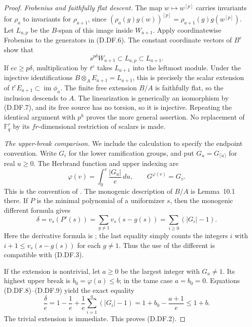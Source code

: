 \begin{proof}
\emph{Frobenius and faithfully flat descent.}
The map $w\mapsto w^{[p]}$ carries invariants for $\rho_a$ to
invariants for $\rho_{a+1}$, since
$(\rho_a(g)g(w))^{[p]}=\rho_{a+1}(g)g(w^{[p]})$.
Let $L_{a,p}$ be the $B$-span of this image inside $W_{a+1}$.
Apply coordinatewise Frobenius to the generators in (D.DF.6).
The constant coordinate vectors of $B^r$ show that
\[
 s^{p\delta}W_{a+1}\subset L_{a,p}\subset L_{a+1}.
                                                               \tag{D.DF.7}
\]
If $ec\ge p\delta$, multiplication by $t^c$ takes $L_{a+1}$
into the leftmost module. Under the injective identifications
$B\otimes_AE_{a+1}=L_{a+1}$, this is precisely the scalar
extension of $t^cE_{a+1}\subset\operatorname{im}\phi_a$.
The finite free extension $B/A$ is faithfully flat, so the
inclusion descends to $A$.
The linearization is generically an isomorphism by (D.DF.7),
and its free source has no torsion, so it is injective.
Repeating the identical argument with $p^h$ proves the more
general assertion. No replacement of $\mathbb F_q^r$ by its
$fr$-dimensional restriction of scalars is made.

\emph{The upper-break comparison.}
We include the calculation to specify the endpoint convention.
Write $G_i$ for the lower ramification groups, and put
$G_u=G_{\lceil u\rceil}$ for real $u\ge0$. The Herbrand
function and upper indexing are
\[
 \varphi(v)=\int_0^v\frac{|G_u|}{e}\,du,
                 \qquad G^{\varphi(v)}=G_v.
                                                               \tag{D.DF.8}
\]
This is the convention of
\citet[Section~10, printed pp.~28--29]{Kedlaya2010DifferentLatticeB}.
The monogenic description of $B/A$ is Lemma~10.1 there.
If $P$ is the minimal polynomial of a uniformizer $s$, then
the monogenic different formula gives
\[
 \delta=v_s(P'(s))
     =\sum_{g\ne1}v_s(s-g(s))
     =\sum_{i\ge0}(|G_i|-1).                           \tag{D.DF.9}
\]
Here the derivative formula is
\citep[Lemmas~49.9.3 and~49.12.1--3, Example~49.12.5,
Tags~0BW6 and~0BWB, with their complete proofs]
{StacksDifferentLatticeB}; the last equality simply counts
the integers $i$ with $i+1\le v_s(s-g(s))$ for each $g\ne1$.
Thus the use of the different is compatible with (D.DF.3).

If the extension is nontrivial, let $a\ge0$ be the largest
integer with $G_a\ne1$. Its highest upper break is
$b_0=\varphi(a)\le b$; in the tame case $a=b_0=0$.
Equations (D.DF.8)--(D.DF.9) yield the exact equality
\[
 \frac\delta e
 =1-\frac1e+\frac1e\sum_{i=1}^a(|G_i|-1)
 =1+b_0-\frac{a+1}{e}\le 1+b.
                                                               \tag{D.DF.10}
\]
The trivial extension is immediate. This proves (D.DF.2).
\end{proof}
